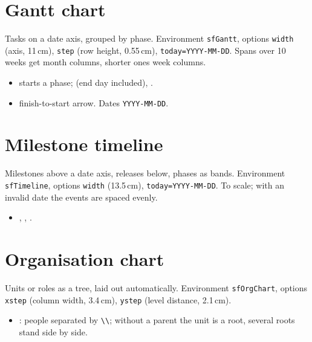 
\section{Gantt chart}

Tasks on a date axis, grouped by phase. Environment \texttt{sfGantt}, options \texttt{width} (axis, 11\,cm), \texttt{step} (row height, 0.55\,cm), \texttt{today=YYYY-MM-DD}. Spans over 10 weeks get month columns, shorter ones week columns.

\begin{itemize}
  \item {} starts a phase;  (end day included), .
  \item {} finish-to-start arrow. Dates \texttt{YYYY-MM-DD}.
\end{itemize}


\section{Milestone timeline}

Milestones above a date axis, releases below, phases as bands. Environment \texttt{sfTimeline}, options \texttt{width} (13.5\,cm), \texttt{today=YYYY-MM-DD}. To scale; with an invalid date the events are spaced evenly.

\begin{itemize}
  \item {}, , .
\end{itemize}


\section{Organisation chart}

Units or roles as a tree, laid out automatically. Environment \texttt{sfOrgChart}, options \texttt{xstep} (column width, 3.4\,cm), \texttt{ystep} (level distance, 2.1\,cm).

\begin{itemize}
  \item {}: people separated by \texttt{\textbackslash\textbackslash}; without a parent the unit is a root, several roots stand side by side.
\end{itemize}

